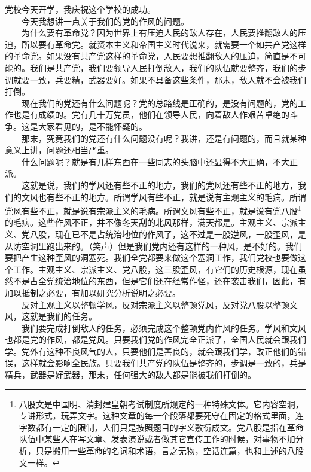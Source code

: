 \documentclass[cn,11pt,chinese]{elegantbook}
\begin{document}
党校今天开学，我庆祝这个学校的成功。\\
　　今天我想讲一点关于我们的党的作风的问题。\\
　　为什么要有革命党？因为世界上有压迫人民的敌人存在，人民要推翻敌人的压迫，所以要有革命党。就资本主义和帝国主义时代说来，就需要一个如共产党这样的革命党。如果没有共产党这样的革命党，人民要想推翻敌人的压迫，简直是不可能的。我们是共产党，我们要领导人民打倒敌人，我们的队伍就要整齐，我们的步调就要一致，兵要精，武器要好。如果不具备这些条件，那末，敌人就不会被我们打倒。\\
　　现在我们的党还有什么问题呢？党的总路线是正确的，是没有问题的，党的工作也是有成绩的。党有几十万党员，他们在领导人民，向着敌人作艰苦卓绝的斗争。这是大家看见的，是不能怀疑的。\\
　　那末，究竟我们的党还有什么问题没有呢？我讲，还是有问题的，而且就某种意义上讲，问题还相当严重。\\
　　什么问题呢？就是有几样东西在一些同志的头脑中还显得不大正确，不大正派。\\
　　这就是说，我们的学风还有些不正的地方，我们的党风还有些不正的地方，我们的文风也有些不正的地方。所谓学风有些不正，就是说有主观主义的毛病。所谓党风有些不正，就是说有宗派主义的毛病。所谓文风有些不正，就是说有党八股\footnote[1]{ 八股文是中国明、清封建皇朝考试制度所规定的一种特殊文体。它内容空洞，专讲形式，玩弄文字。这种文章的每一个段落都要死守在固定的格式里面，连字数都有一定的限制，人们只是按照题目的字义敷衍成文。党八股是指在革命队伍中某些人在写文章、发表演说或者做其它宣传工作的时候，对事物不加分析，只是搬用一些革命的名词和术语，言之无物，空话连篇，也和上述的八股文一样。}的毛病。这些作风不正，并不像冬天刮的北风那样，满天都是。主观主义、宗派主义、党八股，现在已不是占统治地位的作风了，这不过是一股逆风，一股歪风，是从防空洞里跑出来的。（笑声）但是我们党内还有这样的一种风，是不好的。我们要把产生这种歪风的洞塞死。我们全党都要来做这个塞洞工作，我们党校也要做这个工作。主观主义、宗派主义、党八股，这三股歪风，有它们的历史根源，现在虽然不是占全党统治地位的东西，但是它们还在经常作怪，还在袭击我们，因此，有加以抵制之必要，有加以研究分析说明之必要。\\
　　反对主观主义以整顿学风，反对宗派主义以整顿党风，反对党八股以整顿文风，这就是我们的任务。\\
　　我们要完成打倒敌人的任务，必须完成这个整顿党内作风的任务。学风和文风也都是党的作风，都是党风。只要我们党的作风完全正派了，全国人民就会跟我们学。党外有这种不良风气的人，只要他们是善良的，就会跟我们学，改正他们的错误，这样就会影响全民族。只要我们共产党的队伍是整齐的，步调是一致的，兵是精兵，武器是好武器，那末，任何强大的敌人都是能被我们打倒的。\\
\end{document}
